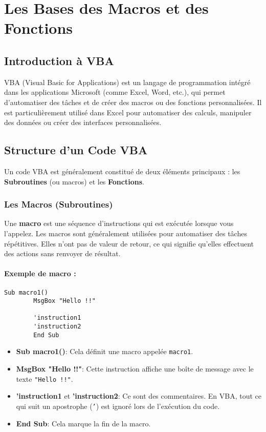 \documentclass[a4paper,12pt]{report}
\begin{document}
	
\chapter{Les Bases des Macros et des Fonctions}
	
	\section{Introduction à VBA}
	VBA (Visual Basic for Applications) est un langage de programmation intégré dans les applications Microsoft (comme Excel, Word, etc.), qui permet d'automatiser des tâches et de créer des macros ou des fonctions personnalisées. Il est particulièrement utilisé dans Excel pour automatiser des calculs, manipuler des données ou créer des interfaces personnalisées.
	
	\section{Structure d'un Code VBA}
	Un code VBA est généralement constitué de deux éléments principaux : les \textbf{Subroutines} (ou macros) et les \textbf{Fonctions}.
	
	\subsection{Les Macros (Subroutines)}
	Une \textbf{macro} est une séquence d'instructions qui est exécutée lorsque vous l'appelez. Les macros sont généralement utilisées pour automatiser des tâches répétitives. Elles n'ont pas de valeur de retour, ce qui signifie qu'elles effectuent des actions sans renvoyer de résultat.
	\newpage
	\subsubsection*{Exemple de macro :}
	\begin{lstlisting}[caption=Macro simple]
		Sub macro1()
		MsgBox "Hello !!"
		
		'instruction1
		'instruction2
		End Sub
	\end{lstlisting}
	
	\begin{itemize}
		\item \textbf{Sub macro1()}: Cela définit une macro appelée \texttt{macro1}.
		\item \textbf{MsgBox "Hello !!"}: Cette instruction affiche une boîte de message avec le texte \texttt{"Hello !!"}.
		\item \textbf{'instruction1} et \textbf{'instruction2}: Ce sont des commentaires. En VBA, tout ce qui suit un apostrophe (\texttt{'}) est ignoré lors de l'exécution du code.
		\item \textbf{End Sub}: Cela marque la fin de la macro.
	\end{itemize}
	
\end{document}
